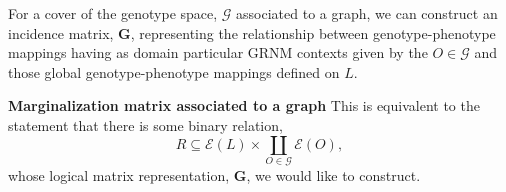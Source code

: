 \begin{frame}
For a cover of the genotype space, $\mathcal{G}$ associated to a graph, we can construct an incidence matrix, $\mathbf{G}$, representing the relationship between genotype-phenotype mappings having as domain particular GRNM contexts given by the $O \in \mathcal{G}$ and those global genotype-phenotype mappings defined on $L$.

\begin{block}{\textbf{Marginalization matrix associated to a graph}}
This is equivalent to the statement that there is some binary relation,
\begin{equation*}
R \subseteq \mathcal{E}(L) \times \coprod_{O \in \mathcal{G}} \mathcal{E}(O),
\end{equation*}
whose logical matrix representation, $\mathbf{G}$, we would like to construct.
\end{block}
\end{frame}
